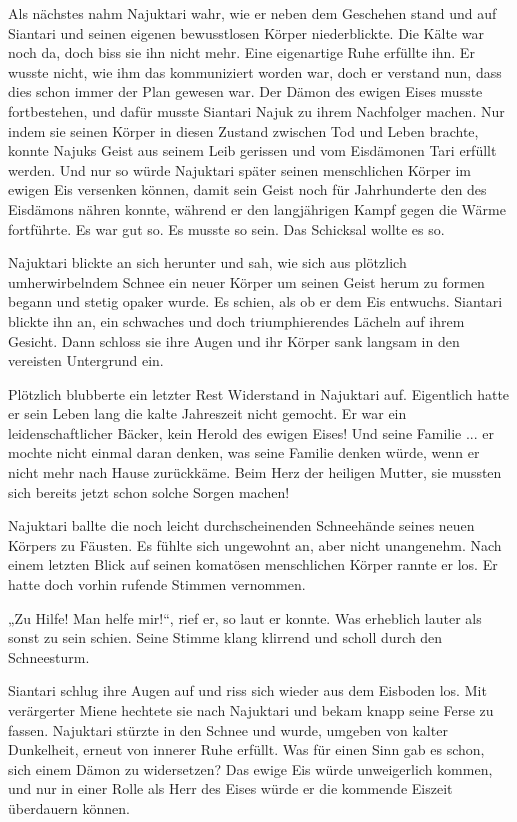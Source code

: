\documentclass[10pt, a4paper, oneside]{book}
\begin{document}
Als nächstes nahm Najuktari wahr, wie er neben dem Geschehen stand und auf Siantari und seinen eigenen bewusstlosen Körper niederblickte. Die Kälte war noch da, doch biss sie ihn nicht mehr. Eine eigenartige Ruhe erfüllte ihn. Er wusste nicht, wie ihm das kommuniziert worden war, doch er verstand nun, dass dies schon immer der Plan gewesen war. Der Dämon des ewigen Eises musste fortbestehen, und dafür musste Siantari Najuk zu ihrem Nachfolger machen. Nur indem sie seinen Körper in diesen Zustand zwischen Tod und Leben brachte, konnte Najuks Geist aus seinem Leib gerissen und vom Eisdämonen Tari erfüllt werden. Und nur so würde Najuktari später seinen menschlichen Körper im ewigen Eis versenken können, damit sein Geist noch für Jahrhunderte den des Eisdämons nähren konnte, während er den langjährigen Kampf gegen die Wärme fortführte. Es war gut so. Es musste so sein. Das Schicksal wollte es so.

Najuktari blickte an sich herunter und sah, wie sich aus plötzlich umherwirbelndem Schnee ein neuer Körper um seinen Geist herum zu formen begann und stetig opaker wurde. Es schien, als ob er dem Eis entwuchs. Siantari blickte ihn an, ein schwaches und doch triumphierendes Lächeln auf ihrem Gesicht. Dann schloss sie ihre Augen und ihr Körper sank langsam in den vereisten Untergrund ein.

Plötzlich blubberte ein letzter Rest Widerstand in Najuktari auf. Eigentlich hatte er sein Leben lang die kalte Jahreszeit nicht gemocht. Er war ein leidenschaftlicher Bäcker, kein Herold des ewigen Eises! Und seine Familie ... er mochte nicht einmal daran denken, was seine Familie denken würde, wenn er nicht mehr nach Hause zurückkäme. Beim Herz der heiligen Mutter, sie mussten sich bereits jetzt schon solche Sorgen machen!

Najuktari ballte die noch leicht durchscheinenden Schneehände seines neuen Körpers zu Fäusten. Es fühlte sich ungewohnt an, aber nicht unangenehm. Nach einem letzten Blick auf seinen komatösen menschlichen Körper rannte er los. Er hatte doch vorhin rufende Stimmen vernommen.

„Zu Hilfe! Man helfe mir!“, rief er, so laut er konnte. Was erheblich lauter als sonst zu sein schien. Seine Stimme klang klirrend und scholl durch den Schneesturm.

Siantari schlug ihre Augen auf und riss sich wieder aus dem Eisboden los. Mit verärgerter Miene hechtete sie nach Najuktari und bekam knapp seine Ferse zu fassen. Najuktari stürzte in den Schnee und wurde, umgeben von kalter Dunkelheit, erneut von innerer Ruhe erfüllt. Was für einen Sinn gab es schon, sich einem Dämon zu widersetzen? Das ewige Eis würde unweigerlich kommen, und nur in einer Rolle als Herr des Eises würde er die kommende Eiszeit überdauern können.
\end{document}
